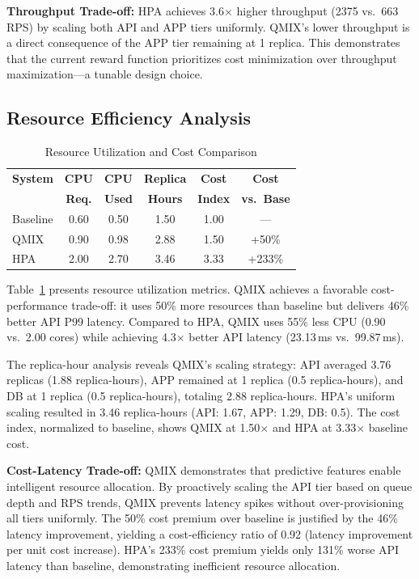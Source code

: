 \documentclass[conference]{IEEEtran}
\begin{document}
\textbf{Throughput Trade-off:} HPA achieves 3.6$\times$ higher throughput
(2375 vs.\ 663 RPS) by scaling both API and APP tiers uniformly. QMIX's
lower throughput is a direct consequence of the APP tier remaining at 1
replica. This demonstrates that the current reward function prioritizes
cost minimization over throughput maximization---a tunable design choice.

\subsection{Resource Efficiency Analysis}

\begin{table}[t]
\centering
\caption{Resource Utilization and Cost Comparison}
\label{tab:resources}
\setlength{\tabcolsep}{4pt}
\begin{tabular}{lccccc}
\toprule
\textbf{System} & \textbf{CPU} & \textbf{CPU} & \textbf{Replica} & \textbf{Cost} & \textbf{Cost} \\
 & \textbf{Req.} & \textbf{Used} & \textbf{Hours} & \textbf{Index} & \textbf{vs.\ Base} \\
\midrule
Baseline & 0.60 & 0.50 & 1.50 & 1.00 & --- \\
QMIX & 0.90 & 0.98 & 2.88 & 1.50 & +50\% \\
HPA & 2.00 & 2.70 & 3.46 & 3.33 & +233\% \\
\bottomrule
\end{tabular}
\end{table}

Table~\ref{tab:resources} presents resource utilization metrics. QMIX
achieves a favorable cost-performance trade-off: it uses 50\% more
resources than baseline but delivers 46\% better API P99 latency.
Compared to HPA, QMIX uses 55\% less CPU (0.90 vs.\ 2.00 cores) while
achieving 4.3$\times$ better API latency (23.13\,ms vs.\ 99.87\,ms).

The replica-hour analysis reveals QMIX's scaling strategy: API averaged
3.76 replicas (1.88 replica-hours), APP remained at 1 replica (0.5
replica-hours), and DB at 1 replica (0.5 replica-hours), totaling 2.88
replica-hours. HPA's uniform scaling resulted in 3.46 replica-hours
(API: 1.67, APP: 1.29, DB: 0.5). The cost index, normalized to baseline,
shows QMIX at 1.50$\times$ and HPA at 3.33$\times$ baseline cost.

\textbf{Cost-Latency Trade-off:} QMIX demonstrates that predictive
features enable intelligent resource allocation. By proactively scaling
the API tier based on queue depth and RPS trends, QMIX prevents latency
spikes without over-provisioning all tiers uniformly. The 50\% cost
premium over baseline is justified by the 46\% latency improvement,
yielding a cost-efficiency ratio of 0.92 (latency improvement per unit
cost increase). HPA's 233\% cost premium yields only 131\% worse API
latency than baseline, demonstrating inefficient resource allocation.
\end{document}
